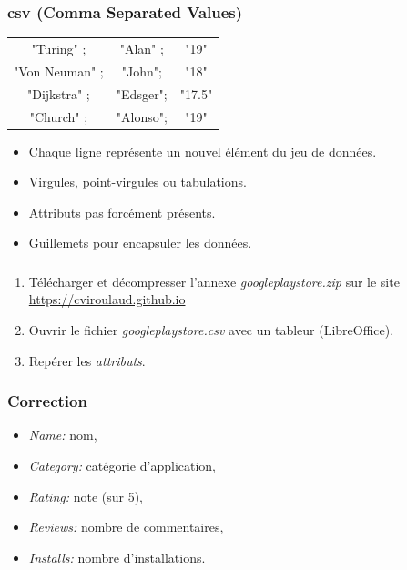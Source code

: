 \documentclass[svgnames,11pt]{beamer}
\begin{document}
\begin{frame}
    \frametitle{csv (Comma Separated Values)}
    \begin{center}
        \begin{tabular}{|*{3}{c}|}
            \hline
            "Turing" ;     & "Alan" ;  & "19"   \\
            "Von Neuman" ; & "John";   & "18"   \\
            "Dijkstra"  ;  & "Edsger"; & "17.5" \\
            "Church"   ;   & "Alonso"; & "19"   \\
            \hline
        \end{tabular}
    \end{center}
    \begin{itemize}
        \item Chaque ligne représente un nouvel élément du jeu de données.
        \item Virgules, point-virgules ou tabulations.
        \item Attributs pas forcément présents.
        \item Guillemets pour encapsuler les données.
    \end{itemize}


\end{frame}
\begin{frame}
    \frametitle{}

    \begin{activite}
        \begin{enumerate}
            \item Télécharger et décompresser l'annexe \emph{googleplaystore.zip} sur le site \url{https://cviroulaud.github.io}
            \item Ouvrir le fichier \emph{googleplaystore.csv} avec un tableur (LibreOffice).
            \item Repérer les \emph{attributs}.
        \end{enumerate}
    \end{activite}

\end{frame}
\begin{frame}
    \frametitle{Correction}

    \begin{itemize}
        \item \emph{Name:} nom,
        \item \emph{Category:} catégorie d'application,
        \item \emph{Rating:} note (sur 5),
        \item \emph{Reviews:} nombre de commentaires,
        \item \emph{Installs:} nombre d'installations.

    \end{itemize}

\end{frame}
\end{document}

